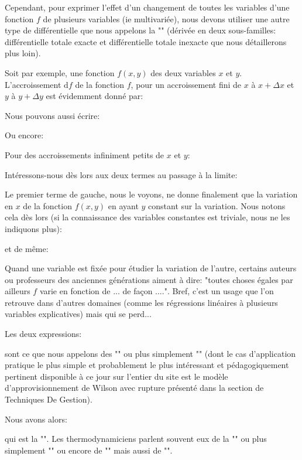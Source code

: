 	Cependant, pour exprimer l'effet d'un changement de toutes les variables d'une fonction $f$ de plusieurs variables (ie multivariée), nous devons utiliser une autre type de différentielle que nous appelons la "" (dérivée en deux sous-familles: différentielle totale exacte et différentielle totale inexacte que nous détaillerons plus loin).
	
	Soit par exemple, une fonction $f(x, y)$ des deux variables $x$ et $y$. L'accroissement $\mathrm{d}f$ de la fonction $f$, pour un accroissement fini de $x$ à $x+\Delta x$ et $y$ à $y+\Delta y$ est évidemment donné par:
	
	Nous pouvons aussi écrire:
	
	Ou encore:
	
	Pour des accroissements infiniment petits de $x$ et $y$:
	
	Intéressons-nous dès lors aux deux termes au passage à la limite:
	
	Le premier terme de gauche, nous le voyons, ne donne finalement que la variation en $x$ de la fonction $f(x, y)$ en ayant $y$ constant sur la variation. Nous notons cela dès lors (si la connaissance des variables constantes est triviale, nous ne les indiquons plus):
	
	et de même:
	
	\begin{tcolorbox}[title=Remarque,colframe=black,arc=10pt]
	Quand une variable est fixée pour étudier la variation de l'autre, certains auteurs ou professeurs des anciennes générations aiment à dire: "toutes choses égales par ailleurs $f$ varie en fonction de ... de façon ....". Bref, c'est un usage que l'on retrouve dans d'autres domaines (comme les régressions linéaires à plusieurs variables explicatives) mais qui se perd...
	\end{tcolorbox}
	Les deux expressions:
	
	sont ce que nous appelons des "" ou plus simplement "\label{partial derivative}" (dont le cas d'application pratique le plus simple et probablement le plus intéressant et pédagogiquement pertinent disponible à ce jour sur l'entier du site est le modèle d'approvisionnement de Wilson avec rupture présenté dans la section de Techniques De Gestion).
	
	Nous avons alors:
	
	qui est la "". Les thermodynamiciens parlent souvent eux de la "\label{total exact differential}" ou plus simplement "" ou encore de "" mais aussi de "".
	

